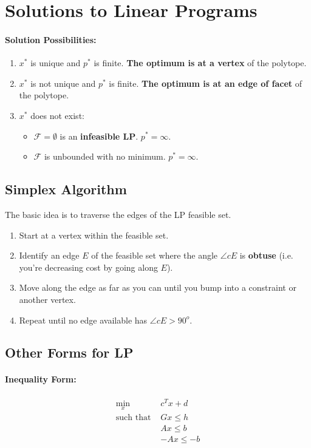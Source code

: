 \documentclass[a4paper,12pt]{report}
\begin{document}
\section{Solutions to Linear Programs}

\paragraph{Solution Possibilities: } 
\begin{enumerate}
\item $x^*$ is unique and $p^*$ is finite. \textbf{The optimum is at a vertex} of the polytope.
\item $x^*$ is not unique and $p^*$ is finite. \textbf{The optimum is at an edge of facet} of the polytope.
\item $x^*$ does not exist:
\begin{itemize}
\item $\mathcal{F} = \emptyset$ is an \textbf{infeasible LP}. $p^* = \infty$.
\item $\mathcal{F}$ is unbounded with no minimum. $p^* = \infty$.
\end{itemize}
\end{enumerate}


\subsection{Simplex Algorithm}
The basic idea is to traverse the edges of the LP feasible set.
\begin{enumerate}
\item Start at a vertex within the feasible set. 
\item Identify an edge $E$ of the feasible set where the angle $\angle c E$ is \textbf{obtuse} (i.e. you're decreasing cost by going along $E$).
\item Move along the edge as far as you can until you bump into a constraint or another vertex. 
\item Repeat until no edge available has $\angle cE > 90^o$.
\end{enumerate}


\subsection{Other Forms for LP}

\paragraph{Inequality Form:} 
\begin{align}
\min_x & c^T x + d \\
\text{such that } & Gx \leq h \\
& Ax \leq b \\
& -Ax \leq -b
\end{align}
\end{document}
